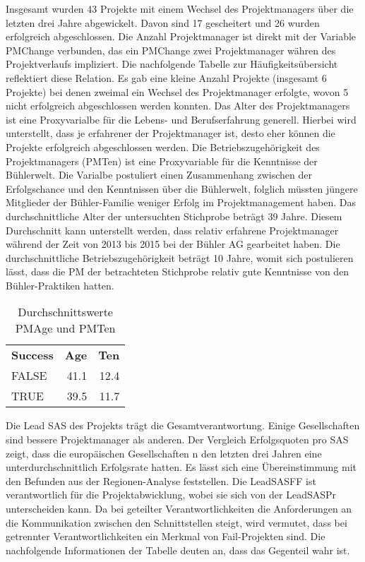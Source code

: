 Insgesamt wurden 43 Projekte mit einem Wechsel des Projektmanagers über die letzten drei Jahre abgewickelt. Davon sind 17 gescheitert und 26 wurden erfolgreich abgeschlossen.
\newline Die Anzahl Projektmanager ist direkt mit der Variable PMChange verbunden, das ein PMChange zwei Projektmanager währen des Projektverlaufs impliziert. Die nachfolgende Tabelle zur Häufigkeitsübersicht reflektiert diese Relation. Es gab eine kleine Anzahl Projekte (insgesamt 6 Projekte) bei denen zweimal ein Wechsel des Projektmanager erfolgte, wovon 5 nicht erfolgreich abgeschlossen werden konnten.
\newline Das Alter des Projektmanagers ist eine Proxyvarialbe für die Lebens- und Berufserfahrung generell. Hierbei wird unterstellt, dass je erfahrener der Projektmanager ist, desto eher können die Projekte erfolgreich abgeschlossen werden. Die Betriebszugehörigkeit des Projektmanagers (PMTen) ist eine Proxyvariable für die Kenntnisse der Bühlerwelt. Die Varialbe postuliert einen Zusammenhang zwischen der Erfolgschance und den Kenntnissen über die Bühlerwelt, folglich müssten jüngere Mitglieder der Bühler-Familie weniger Erfolg im Projektmanagement haben. Das durchschnittliche Alter der untersuchten Stichprobe beträgt 39 Jahre. Diesem Durchschnitt kann unterstellt werden, dass relativ erfahrene Projektmanager während der Zeit von 2013 bis 2015 bei der Bühler AG gearbeitet haben. Die durchschnittliche Betriebszugehörigkeit beträgt 10 Jahre, womit sich postulieren lässt, dass die PM der betrachteten Stichprobe relativ gute Kenntnisse von den Bühler-Praktiken hatten.
\begin{table}[htbp]
	\centering
	\caption{Durchschnittswerte PMAge und PMTen}
	\begin{tabular}{lrr}
		\textbf{Success} & \multicolumn{1}{l}{\textbf{Age}} & \multicolumn{1}{l}{\textbf{Ten}} \\
		FALSE & 41.1 & 12.4 \\
		TRUE  & 39.5 & 11.7 \\
	\end{tabular}%
	\label{tab:addlabel}%
\end{table}%
 Die Lead SAS des Projekts trägt die Gesamtverantwortung. Einige Gesellschaften sind bessere Projektmanager als anderen. Der Vergleich Erfolgsquoten pro SAS zeigt, dass die europäischen Gesellschaften n den letzten drei Jahren eine unterdurchschnittlich Erfolgsrate hatten. Es lässt sich eine Übereinstimmung mit den Befunden aus der Regionen-Analyse feststellen.
\newline Die LeadSASFF ist verantwortlich für die Projektabwicklung, wobei sie sich von der LeadSASPr unterscheiden kann. Da bei geteilter Verantwortlichkeiten die Anforderungen an die Kommunikation zwischen den Schnittstellen steigt, wird vermutet, dass bei getrennter Verantwortlichkeiten ein Merkmal von Fail-Projekten sind. Die nachfolgende Informationen der Tabelle deuten an, dass das Gegenteil wahr ist. 
